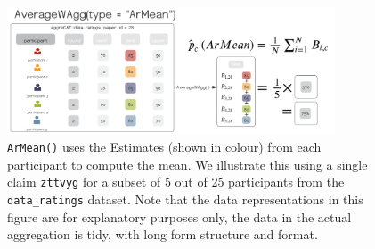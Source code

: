\documentclass[article]{jss}
\begin{document}
\begin{figure}

{\centering \includegraphics[width=3.83in,height=\textheight]{images/paste-80B1C5CB.png}

}

\caption{\label{fig-ArMean}\texttt{ArMean()} uses the Estimates (shown
in colour) from each participant to compute the mean. We illustrate this
using a single claim \texttt{zttvyg} for a subset of 5 out of 25
participants from the \texttt{data\_ratings} dataset. Note that the data
representations in this figure are for explanatory purposes only, the
data in the actual aggregation is tidy, with long form structure and
format.}

\end{figure}
\end{document}
